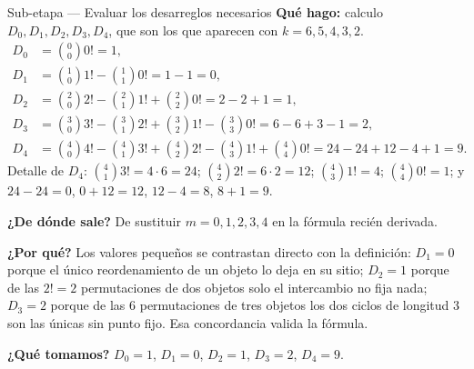 \documentclass[11pt]{article}
\begin{document}
\begin{paso}{Sub-etapa --- Evaluar los desarreglos necesarios}
\textbf{Qu\'e hago:} calculo $D_0,D_1,D_2,D_3,D_4$, que son los que aparecen con $k=6,5,4,3,2$.
\[
\begin{aligned}
D_0&=\binom{0}{0}0!=1,\\[2pt]
D_1&=\binom{1}{0}1!-\binom{1}{1}0!=1-1=0,\\[2pt]
D_2&=\binom{2}{0}2!-\binom{2}{1}1!+\binom{2}{2}0!=2-2+1=1,\\[2pt]
D_3&=\binom{3}{0}3!-\binom{3}{1}2!+\binom{3}{2}1!-\binom{3}{3}0!=6-6+3-1=2,\\[2pt]
D_4&=\binom{4}{0}4!-\binom{4}{1}3!+\binom{4}{2}2!-\binom{4}{3}1!+\binom{4}{4}0!=24-24+12-4+1=9 .
\end{aligned}
\]
Detalle de $D_4$: $\binom{4}{1}3!=4\cdot 6=24$; $\binom{4}{2}2!=6\cdot 2=12$; $\binom{4}{3}1!=4$;
$\binom{4}{4}0!=1$; y $24-24=0$, $0+12=12$, $12-4=8$, $8+1=9$.

\textbf{¿De d\'onde sale?} De sustituir $m=0,1,2,3,4$ en la f\'ormula reci\'en derivada.

\textbf{¿Por qu\'e?} Los valores peque\~nos se contrastan directo con la definici\'on: $D_1=0$ porque el
\'unico reordenamiento de un objeto lo deja en su sitio; $D_2=1$ porque de las $2!=2$ permutaciones de dos
objetos solo el intercambio no fija nada; $D_3=2$ porque de las $6$ permutaciones de tres objetos los dos
ciclos de longitud $3$ son las \'unicas sin punto fijo. Esa concordancia valida la f\'ormula.

\textbf{¿Qu\'e tomamos?} $D_0=1$, $D_1=0$, $D_2=1$, $D_3=2$, $D_4=9$.
\end{paso}
\end{document}
